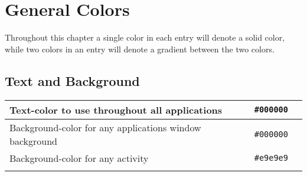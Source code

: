 
\newcommand\colorbreak{\noindent\rule{\textwidth}{0.4pt}}

\chapter{General Colors}
Throughout this chapter a single color in each entry will denote a solid color, while two colors in an entry will denote a gradient between the two colors.

\section{Text and Background}

\begin{table}[h]
	\begin{tabularx}{\textwidth}{X r c}

	Text-color to use throughout all applications 
	& \texttt{\#000000} & \cellcolor[HTML]{000000}\phantom{--} \\ \hline \addlinespace[2ex]

	Background-color for any applications window background 
	& \texttt{\#000000} & \cellcolor[HTML]{000000}\phantom{--} \\ \hline \addlinespace[2ex]

	Background-color for any activity 
	& \texttt{\#e9e9e9} & \cellcolor[HTML]{e9e9e9}\phantom{--} \\ \hline \addlinespace[2ex]

	\end{tabularx}
\end{table}